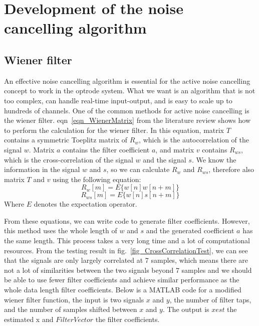\section{Development of the noise cancelling algorithm}

\subsection{Wiener filter}

An effective noise cancelling algorithm is essential for the active noise cancelling concept to work in the optrode system.  What we want is an algorithm that is not too complex, can handle real-time input-output, and is easy to scale up to hundreds of channels.  One of the common methods for active noise cancelling is the wiener filter.  eqn~\ref{eqn_WienerMatrix} from the literature review shows how to perform the calculation for the wiener filter.  In this equation, matrix $T$ contains a symmetric Toeplitz matrix of $R_w$, which is the autocorrelation of the signal $w$.  Matrix $a$ contains the filter coefficient $a$, and matrix $v$ contains $R_{ws}$, which is the cross-correlation of the signal $w$ and the signal $s$.  We know the information in the signal $w$ and $s$, so we can calculate $R_w$ and $R_{ws}$, therefore also matrix $T$ and $v$ using the following equation:
$$R_w[m]=E\{w[n]w[n+m]\}$$
$$R_{ws}[m]=E\{w[n]s[n+m]\}$$
Where $E$ denotes the expectation operator.

From these equations, we can write code to generate filter coefficients.  However, this method uses the whole length of $w$ and $s$ and the generated coefficient $a$ has the same length.  This process takes a very long time and a lot of computational resources.  From the testing result in fig.~\ref{fig_CrossCorrelationTest}, we can see that the signals are only largely correlated at 7 samples, which means there are not a lot of similarities between the two signals beyond 7 samples and we should be able to use fewer filter coefficients and achieve similar performance as the whole data length filter coefficients.  Below is a MATLAB code for a modified wiener filter function, the input is two signals $x$ and $y$, the number of filter taps, and the number of samples shifted between $x$ and $y$.  The output is $xest$ the estimated x and $FilterVector$ the filter coefficients.

